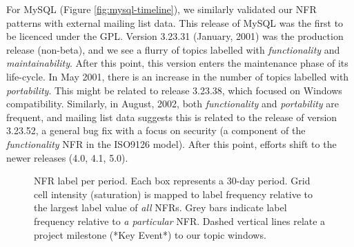 \documentclass[]{sig-alternate}
\begin{document}
For MySQL (Figure \ref{fig:mysql-timeline}), we similarly validated our NFR patterns with external mailing list data. 
This release of MySQL was the first to be licenced under the GPL. 
Version 3.23.31 (January, 2001) was the production release (non-beta), and we see a flurry of topics labelled with \emph{functionality} and \emph{maintainability}. 
After this point, this version enters the maintenance phase of its life-cycle. 
In May 2001, there is an increase in the number of topics labelled with \emph{portability}. 
This might be related to release 3.23.38, which focused on Windows compatibility. 
Similarly, in August, 2002, both \emph{functionality} and \emph{portability} are frequent, and mailing list data suggests this is related to the release of version 3.23.52, a general bug fix with a focus on security (a component of the \emph{functionality} NFR in the ISO9126 model). 
After this point, efforts shift to the newer releases (4.0, 4.1, 5.0). 

\begin{figure}[ht]
\centering
{}           
                                             
	\caption[]{NFR label per period. Each box represents a 30-day period. %
	Grid cell intensity (saturation) is mapped to label frequency relative to the largest label value of \emph{all} NFRs. Grey bars indicate label frequency relative to \emph{a particular} NFR. Dashed vertical lines relate a project milestone (*Key Event*) to our topic windows. 
}
\label{fig:timelines}
\end{figure}
\end{document}
